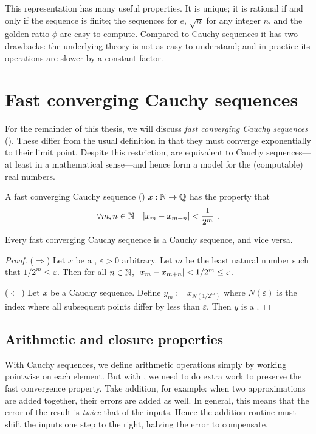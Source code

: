 \documentclass[leqno]{report}
\begin{document}
This representation has many useful properties. It is unique; it is rational if and only if the sequence is finite; the sequences for $e$, $\sqrt{n}$ for any integer $n$, and the golden ratio $\phi$ are easy to compute. Compared to Cauchy sequences it has two drawbacks: the underlying theory is not as easy to understand; and in practice its operations are slower by a constant factor.

\chapter{Fast converging Cauchy sequences}

For the remainder of this thesis, we will discuss \textit{fast converging Cauchy sequences} (\FCCS). These differ from the usual definition in that they must converge exponentially to their limit point. Despite this restriction, \FCCS{} are equivalent to Cauchy sequences---at least in a mathematical sense---and hence form a model for the (computable) real numbers.

\begin{Definition}
    A fast converging Cauchy sequence (\FCCS) $x : \mathbb{N} \rightarrow \mathbb{Q}$ has the property that
    \[ \forall {m, n \in \mathbb{N}} \quad { \left| x_m - x_{m+n} \right| < \frac{1}{2^m} } \ . \]
\end{Definition}

\begin{Proposition}
    Every fast converging Cauchy sequence is a Cauchy sequence, and vice versa.
\end{Proposition}

\begin{proof}
    ($\Rightarrow$) Let $x$ be a \FCCS, $\varepsilon > 0$ arbitrary. Let $m$ be the least natural number such that $1/2^m \leq \varepsilon$. Then for all $n \in \mathbb{N}$, $\left| x_m - x_{m+n} \right| < 1/2^m \leq \varepsilon$.

    ($\Leftarrow$) Let $x$ be a Cauchy sequence. Define $y_m := x_{N(1/2^m)}$ where $N(\varepsilon)$ is the index where all subsequent points differ by less than $\varepsilon$. Then $y$ is a \FCCS.
\end{proof}

\section{Arithmetic and closure properties}

With Cauchy sequences, we define arithmetic operations simply by working pointwise on each element. But with \FCCS, we need to do extra work to preserve the fast convergence property. Take addition, for example: when two approximations are added together, their errors are added as well. In general, this means that the error of the result is \textit{twice} that of the inputs. Hence the addition routine must shift the inputs one step to the right, halving the error to compensate.
\end{document}
